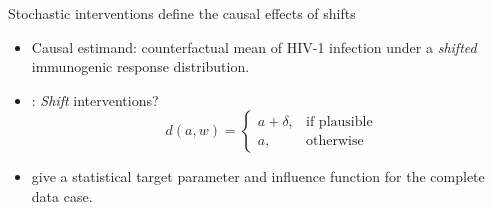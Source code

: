 \documentclass{beamer}
\begin{document}
\begin{frame}[c]{Stochastic interventions define the causal effects of shifts}

\begin{center}
\begin{itemize}
  \itemsep10pt
  \item Causal estimand: counterfactual mean of HIV-1 infection under a
    \textit{shifted} immunogenic response distribution.
  \item \cite{diaz2012population, diaz2018stochastic}: \textit{Shift}
    interventions?
     \begin{equation*}\label{shift_intervention}
       d(a, w) =
         \begin{cases}
           a + \delta, & \text{if plausible} \\
           a, & \text{otherwise}
         \end{cases}
     \end{equation*}
  \item \cite{diaz2012population, diaz2018stochastic} give a statistical target
    parameter and influence function for the complete data case.
\end{itemize}
\end{center}


\end{frame}

\end{document}
